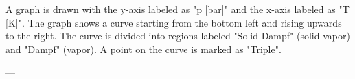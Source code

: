 A graph is drawn with the y-axis labeled as "p [bar]" and the x-axis labeled as "T [K]". The graph shows a curve starting from the bottom left and rising upwards to the right. The curve is divided into regions labeled "Solid-Dampf" (solid-vapor) and "Dampf" (vapor). A point on the curve is marked as "Triple".

---
